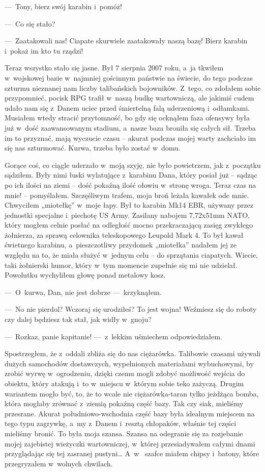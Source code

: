 ---~Tony, bierz swój karabin i~pomóż!

---~Co się stało?

---~Zaatakowali nas! Ciapate skurwiele zaatakowały naszą bazę! Bierz karabin i~pokaż im kto tu rządzi!

Teraz wszystko stało się jasne. Był 7 sierpnia 2007 roku, a~ja tkwiłem w~wojskowej bazie w~najmniej gościnnym 
państwie na świecie, do tego podczas szturmu nieznanej nam liczby talibańskich bojowników. Z~tego, co zdołałem sobie 
przypomnieć, pocisk RPG trafił w~naszą budkę wartowniczą, ale jakimiś cudem udało nam się z~Danem uciec przed 
śmiertelną falą uderzeniową i~odłamkami. Musiałem wtedy stracić przytomność, bo gdy się ocknąłem faza ofensywy była 
już w~dość zaawansowanym stadium, a~nasze baza broniła się całych sił. Trzeba im to przyznać, mają wyczucie czasu -- 
akurat podczas mojej warty zachciało im się nas szturmować. Kurwa, trzeba było zostać w~domu.

Gorące coś, co ciągle uderzało w~moją szyję, nie było powietrzem, jak z~początku sądziłem. Były nimi łuski wylatujące 
z~karabinu Dana, który posiał już -- sądząc po ich ilości na ziemi -- dość pokaźną ilość ołowiu w~stronę wroga. Teraz 
czas na mnie! -- pomyślałem. Szczęśliwym trafem, moja broń leżała kawałek ode mnie. Chwyciłem „miotełkę” w~moje łapy. 
Był to karabin Mk14 EBR, używany przez jednostki specjalne i~piechotę US Army. Zasilany nabojem 7,72x51mm NATO, który 
mogłem celnie posłać na odległość mocno przekraczającą zasięg zwykłego żołnierza, za sprawą celownika teleskopowego 
Leupold Mark 4.  To był kawał świetnego karabinu, a~pieszczotliwy przydomek „miotełka” nadałem jej ze względu na to, 
że miała służyć w~jednym celu -- do sprzątania ciapatych. Wiecie, taki żołnierski humor, który w~tym momencie 
zupełnie się mi nie udzielał. Powolutku wychyliłem głowę ponad metalowy kosz. 

---~O~kurwa, Dan, nie jest dobrze ---~krzyknąłem.

---~No nie pierdol? Wczoraj się urodziłeś? To jest wojna! Weźmiesz się do roboty czy dalej będziesz tak stał, jak 
widły w~gnoju?

---~Rozkaz, panie kapitanie! ---~z~lekkim uśmiechem odpowiedziałem.

Spostrzegłem, że z~oddali zbliża się do nas ciężarówka. Talibowie czasami używali dużych samochodów dostawczych, 
wypełnionych materiałami wybuchowymi, by zrobić wyrwę w~ogrodzeniu, dzięki czemu mogli zdobyć możliwość wejścia do 
obiektu, który atakują i~to w~miejscu w~którym sobie teko zażyczą. Drugim wariantem mogło być, to, że to wcale nie 
ciężarówka-taran tylko jeżdżąca bomba, która mogłaby zrównać z~ziemią pokaźną część bazy. Tak czy siak, mieliśmy 
przesrane. Akurat południowo-wschodnia część bazy była idealnym miejscem na tego typu zagrywkę, a~my z~Danem i~resztą 
chłopaków, właśnie tej części mieliśmy bronić. To była moja szansa. Szansa na odegranie się za rozjebanie mojej 
zajebistej wieżyczki wartowniczej, w~której przesiadywałem całymi dnami przyglądając się tej zasranej pustyni… A~w~
szafce miałem chipsy i~batony, które przegryzałem w~wolnych chwilach. 

